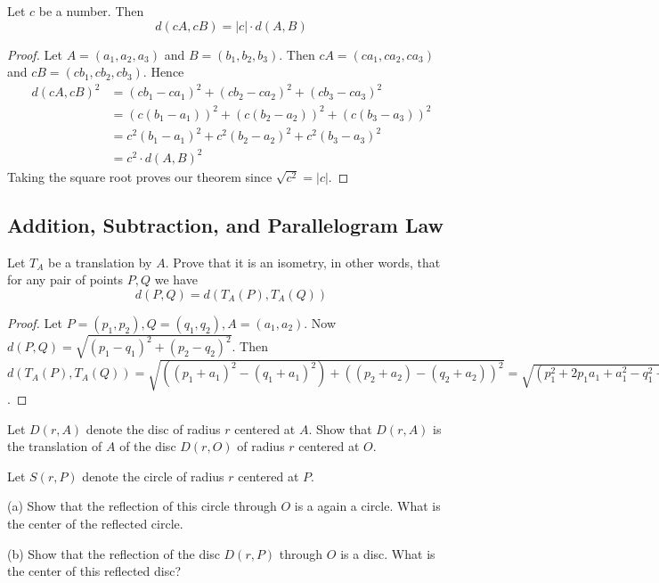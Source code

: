 \begin{theorem}
    Let $c$ be a number. Then 
    \[d(c A, c B) = |c| \cdot d(A, B)\]
\end{theorem}
\begin{proof}
    Let $A = (a_1, a_2, a_3)$ and $B = (b_1, b_2, b_3)$.
    Then $c A = (c a_1, c a_2, c a_3)$ and $c B = (c b_1, c b_2, c b_3)$.
    Hence 
    \begin{align*}
        d(c A, c B)^2 
            &= (c b_1 - c a_1)^2 + (c b_2 - c a_2)^2 + (c b_3 - c a_3)^2 \\
            &= (c (b_1 - a_1))^2 + (c (b_2 - a_2))^2 + (c (b_3 - a_3))^2 \\
            &= c^2(b_1 - a_1)^2 + c^2(b_2 - a_2)^2 + c^2(b_3 - a_3)^2 \\
            &= c^2 \cdot d(A, B)^2
    \end{align*}
    Taking the square root proves our theorem since $\sqrt{c^2} = |c|$.
\end{proof}

\subsection{Addition, Subtraction, and Parallelogram Law}

\begin{tcolorbox}[title=Problem 11, breakable]
    Let $T_A$ be a translation by $A$. Prove that it is an isometry,
    in other words, that for any pair of points $P, Q$ we have 
    \[d(P, Q) = d(T_A(P), T_A(Q))\]
\end{tcolorbox}

\begin{proof}
    Let $P = (p_1, p_2), Q = (q_1, q_2), A = (a_1, a_2)$.
    Now $d(P, Q) = \sqrt{(p_1 - q_1)^2 + (p_2 - q_2)^2}$.
    Then $d(T_A(P), T_A(Q)) 
        = \sqrt{((p_1 + a_1)^2 - (q_1 + a_1)^2) + ((p_2 + a_2) - (q_2 + a_2))^2}
        = \sqrt{(p_1^2 + 2 p_1 a_1 + a_1^2 - q_1^2 - 2 q_1 a_1 - a_1^2) + ()} $.
\end{proof}

\begin{tcolorbox}[title=Problem 12, breakable]
    Let $D(r, A)$ denote the disc of radius $r$ centered at $A$.
    Show that $D(r, A)$ is the translation of $A$ of the disc $D(r, O)$
    of radius $r$ centered at $O$.
\end{tcolorbox}

\begin{tcolorbox}[title=Problem 13, breakable]
    Let $S(r, P)$ denote the circle of radius $r$ centered at $P$.

    (a) Show that the reflection of this circle through $O$ is a again a circle.
        What is the center of the reflected circle.

    (b) Show that the reflection of the disc $D(r, P)$ through $O$ is a disc.
        What is the center of this reflected disc?
\end{tcolorbox}

